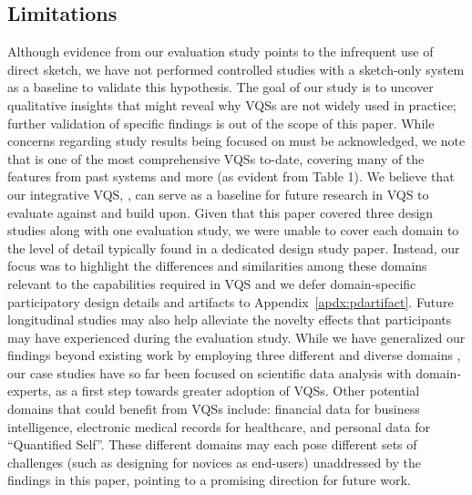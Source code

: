  \subsection{Limitations}%
 \par Although evidence from our evaluation study points to the infrequent use of direct sketch, we have not performed controlled studies with a sketch-only system as a baseline to validate this hypothesis. The goal of our study is to uncover qualitative insights that might reveal why VQSs are not widely used in practice; further validation of specific findings is out of the scope of this paper. While concerns regarding study results being focused on \zvpp must be acknowledged, we note that \zvpp is one of the most comprehensive VQSs to-date, covering many of the features from past systems and more (as evident from Table 1). We believe that our integrative VQS, \zvpp, can serve as a baseline for future research in VQS to evaluate against and build upon. Given that this paper covered three design studies along with one evaluation study, we were unable to cover each domain to the level of detail typically found in a dedicated design study paper. Instead, our focus was to highlight the differences and similarities among these domains relevant to the capabilities required in VQS and we defer domain-specific participatory design details and artifacts to Appendix~\ref{apdx:pdartifact}. Future longitudinal studies may also help alleviate the novelty effects that participants may have experienced during the evaluation study. While we have generalized our findings beyond existing work by employing three different and diverse domains ,
 our case studies have so far
 been focused on scientific data analysis with domain-experts,
 as a first step towards greater adoption of VQSs.
 Other potential domains that could benefit from VQSs include:
 financial data for business intelligence,
 electronic medical records for healthcare,
 and personal data for ``Quantified Self''.
 These different domains may each pose different sets of challenges (such as designing for novices as end-users) unaddressed by the findings in this paper,
  pointing to a promising direction for future work.